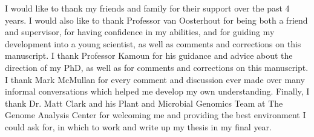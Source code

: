 I would like to thank my friends and family for their support over the past 4 years.
I would also like to thank Professor van Oosterhout for being both a friend and supervisor, for having confidence in my abilities, and for guiding my development into a young scientist, as well as comments and corrections on this manuscript.
I thank Professor Kamoun for his guidance and advice about the direction of my PhD, as well as for comments and corrections on this manuscript. 
I thank Mark McMullan for every comment and discussion ever made over many informal conversations which helped me develop my own understanding.
Finally, I thank Dr. Matt Clark and his Plant and Microbial Genomics Team at The Genome Analysis Center for welcoming me and providing the best environment I could ask for, in which to work and write up my thesis in my final year. 